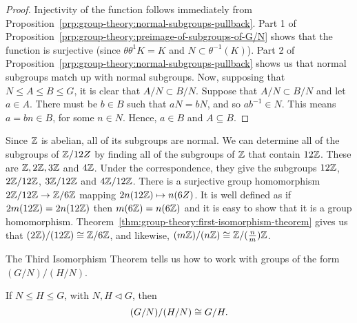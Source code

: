 \begin{proof}
  Injectivity of the function follows immediately from Proposition~\ref{prp:group-theory:normal-subgroups-pullback}.
  Part 1 of Proposition~\ref{prp:group-theory:preimage-of-subgroups-of-G/N} shows that the function is surjective (since \(\theta\theta^{1}K = K\) and \(N \subset \theta^{-1}(K)\)).
  Part 2 of Proposition~\ref{prp:group-theory:normal-subgroups-pullback} shows us that normal subgroups match up with normal subgroups.
  Now, supposing that \(N \leq A \leq B \leq G\), it is clear that \(A/N \subset B/N\).
  Suppose that \(A/N \subset B/N\) and let \(a \in A\).
  There must be \(b \in B\) such that \(aN = bN\), and so \(ab^{-1} \in N\).
  This means \(a = bn \in B\), for some \(n \in N\).
  Hence, \(a \in B\) and \(A \subseteq B\).
\end{proof}

\begin{example}
  Since \(\mathbb{Z}\) is abelian, all of its subgroups are normal.
  We can determine all of the subgroups of \(\mathbb{Z}/12Z\) by finding all of the subgroups of \(\mathbb{Z}\) that contain \(12\mathbb{Z}\).
  These are \(\mathbb{Z}, 2\mathbb{Z}, 3\mathbb{Z}\) and \(4\mathbb{Z}\).
  Under the correspondence, they give the subgroups \(12\mathbb{Z}\), \(2\mathbb{Z} / 12\mathbb{Z}\), \(3\mathbb{Z} / 12\mathbb{Z}\) and \(4\mathbb{Z} / 12\mathbb{Z}\).
  There is a surjective group homomorphism \(2\mathbb{Z} / 12\mathbb{Z} \to \mathbb{Z}/6\mathbb{Z}\) mapping \(2n(12\mathbb{Z}) \mapsto n(6Z)\).
  It is well defined as if \(2m(12\mathbb{Z}) = 2n(12\mathbb{Z})\) then \(m(6\mathbb{Z}) = n(6\mathbb{Z})\) and it is easy to show that it is a group homomorphism.
  Theorem~\ref{thm:group-theory:first-isomorphism-theorem} gives us that \((2\mathbb{Z}) / (12\mathbb{Z}) \cong \mathbb{Z}/6\mathbb{Z}\), and likewise, \((m\mathbb{Z}) / (n\mathbb{Z}) \cong \mathbb{Z}/(\frac n m)\mathbb{Z}\).
\end{example}

The Third Isomorphism Theorem tells us how to work with groups of the form \((G/N)/(H/N)\).

\begin{theorem}
  \label{thm:group-theory:the-third-isomorphism-theorem}
  If \(N \leq H \leq G\), with \(N, H \triangleleft G\), then
  \[(G/N)/(H/N) \cong G/H.\]
\end{theorem}

